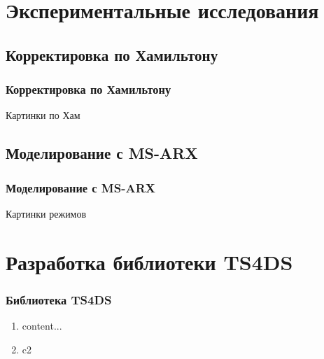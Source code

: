 \documentclass{beamer}
\begin{document}
	\section{Экспериментальные исследования}
		\subsection{Корректировка по Хамильтону}
		\begin{frame}
			\frametitle{Корректировка по Хамильтону}
			
			Картинки по Хам
			
		\end{frame}

		\subsection{Моделирование с MS-ARX}
		\begin{frame}
			\frametitle{Моделирование с MS-ARX}
			
			Картинки режимов
			
		\end{frame}
	
	\section{Разработка библиотеки TS4DS}
		\begin{frame}
			\frametitle{Библиотека TS4DS}
			
			\begin{enumerate}
				\item content...
				\item c2
			\end{enumerate}
			
		\end{frame}

	
\end{document}
